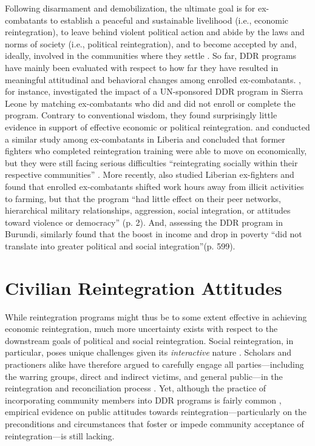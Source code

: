 Following disarmament and demobilization, the ultimate goal is for ex-combatants to establish a peaceful and sustainable livelihood (i.e., economic reintegration), to leave behind violent political action and abide by the laws and norms of society (i.e., political reintegration), and to become accepted by and, ideally, involved in the communities where they settle \citep[i.e., social reintegration;][]{Gilligan2012, Kaplan2018, UN2014}. So far, DDR programs have mainly been evaluated with respect to how far they have resulted in meaningful attitudinal and behavioral changes among enrolled ex-combatants. \cite{Humphreys2007}, for instance, investigated the impact of a UN-sponsored DDR program in Sierra Leone by matching ex-combatants who did and did not enroll or complete the program. Contrary to conventional wisdom, they found surprisingly little evidence in support of effective economic or political reintegration. \cite{Pugel2007} and \cite{Levely2014} conducted a similar study among ex-combatants in Liberia and concluded that former fighters who completed reintegration training were able to move on economically, but they were still facing serious difficulties ``reintegrating socially within their respective communities'' \citep[][p. 4]{Pugel2007}. More recently, \cite{Blattman2016} also studied Liberian ex-fighters and found that enrolled ex-combatants shifted work hours away from illicit activities to farming, but that the program ``had little effect on their peer networks, hierarchical military relationships, aggression, social integration, or attitudes toward violence or democracy'' (p. 2). And, assessing the DDR program in Burundi, \cite{Gilligan2012} similarly found that the boost in income and drop in poverty ``did not translate into greater political and social integration''(p. 599).


\section{Civilian Reintegration Attitudes}

While reintegration programs might thus be to some extent effective in achieving economic reintegration, much more uncertainty exists with respect to the downstream goals of political and social reintegration. Social reintegration, in particular, poses unique challenges given its \textit{interactive }nature \citep[][p. 133, emphasis added]{Kaplan2018}. Scholars and practioners alike have therefore argued to carefully engage all parties---including the warring groups, direct and indirect victims, and general public---in the reintegration and reconciliation process \citep{Lederach2012, UN2014}. Yet, although the practice of incorporating community members into DDR programs is fairly common \citep[][p. 135]{Kaplan2018}, empirical evidence on public attitudes towards reintegration---particularly on the preconditions and circumstances that foster or impede community acceptance of reintegration---is still lacking. 


